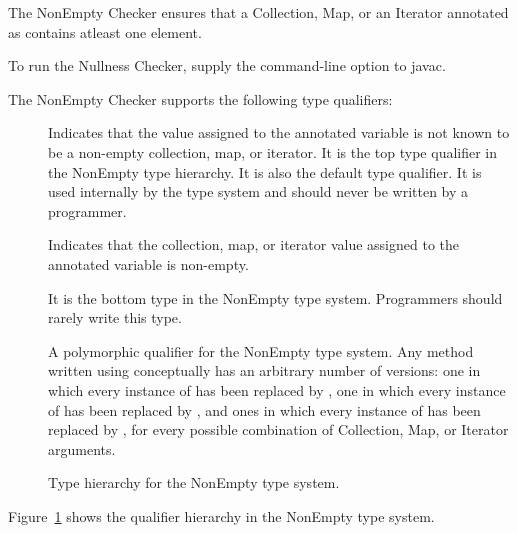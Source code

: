 \htmlhr
{}

The NonEmpty Checker ensures that a Collection, Map, or an Iterator annotated as
 contains atleast one element.

To run the Nullness Checker, supply the
command-line option to javac.

The NonEmpty Checker supports the following type qualifiers:
\begin{description}

    \item[]
    Indicates that the value assigned to the annotated variable is not known to be a non-empty
    collection, map, or iterator. It is the top type qualifier in the NonEmpty type hierarchy. It is also the default type
    qualifier.
    It is used internally by the type system and should never be written by a programmer.

    \item[]
    Indicates that the collection, map, or iterator value assigned to the annotated variable is non-empty.

    \item[]
    It is the bottom type in the NonEmpty type system. Programmers should rarely write this type.

    \item[]
    A polymorphic qualifier for the NonEmpty type system.
    Any method written using  conceptually has an arbitrary number of
    versions: one in which every instance of  has been replaced by
    , one in which every instance of 
    has been replaced by , and ones in which every instance of
     has been replaced by , for every possible
    combination of Collection, Map, or Iterator arguments.

\end{description}

\begin{figure}
    \caption{Type hierarchy for the NonEmpty type system.}
    \label{fig-nonempty-hierarchy}
\end{figure}

Figure~\ref{fig-nonempty-hierarchy} shows the qualifier hierarchy in the NonEmpty type system.
